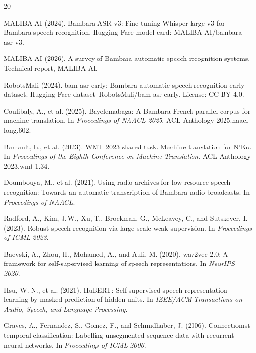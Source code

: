 \documentclass[11pt]{article}
\begin{document}
\begin{thebibliography}{20}

MALIBA-AI (2024).
Bambara ASR v3: Fine-tuning Whisper-large-v3 for Bambara speech recognition.
Hugging Face model card: MALIBA-AI/bambara-asr-v3.

MALIBA-AI (2026).
A survey of Bambara automatic speech recognition systems.
Technical report, MALIBA-AI.

RobotsMali (2024).
bam-asr-early: Bambara automatic speech recognition early dataset.
Hugging Face dataset: RobotsMali/bam-asr-early. License: CC-BY-4.0.

Coulibaly, A., et al. (2025).
Bayelemabaga: A Bambara-French parallel corpus for machine translation.
In \emph{Proceedings of NAACL 2025}. ACL Anthology 2025.naacl-long.602.

Barrault, L., et al. (2023).
WMT 2023 shared task: Machine translation for N'Ko.
In \emph{Proceedings of the Eighth Conference on Machine Translation}. ACL Anthology 2023.wmt-1.34.

Doumbouya, M., et al. (2021).
Using radio archives for low-resource speech recognition: Towards an automatic transcription of Bambara radio broadcasts.
In \emph{Proceedings of NAACL}.

Radford, A., Kim, J.\,W., Xu, T., Brockman, G., McLeavey, C., and Sutskever, I. (2023).
Robust speech recognition via large-scale weak supervision.
In \emph{Proceedings of ICML 2023}.

Baevski, A., Zhou, H., Mohamed, A., and Auli, M. (2020).
wav2vec 2.0: A framework for self-supervised learning of speech representations.
In \emph{NeurIPS 2020}.

Hsu, W.-N., et al. (2021).
HuBERT: Self-supervised speech representation learning by masked prediction of hidden units.
In \emph{IEEE/ACM Transactions on Audio, Speech, and Language Processing}.

Graves, A., Fernandez, S., Gomez, F., and Schmidhuber, J. (2006).
Connectionist temporal classification: Labelling unsegmented sequence data with recurrent neural networks.
In \emph{Proceedings of ICML 2006}.


\end{thebibliography}
\end{document}
